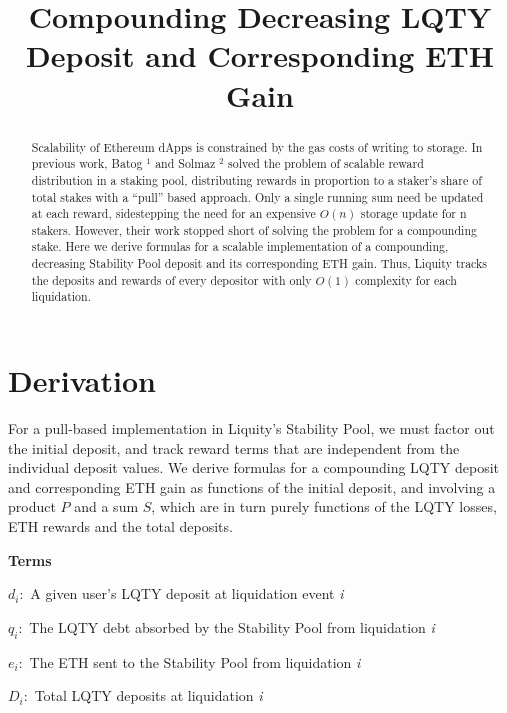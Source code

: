 \documentclass[reqno]{article}
\begin{document}
\title{\textbf{Compounding Decreasing LQTY Deposit and Corresponding ETH Gain}}
\date{} %
\maketitle
\begin{abstract}
    Scalability of Ethereum dApps is constrained by the gas costs of writing to storage. 
    In previous work, Batog $^{1}$ and Solmaz $^{2}$ solved the problem of scalable reward distribution in a staking pool, distributing rewards in proportion to a staker’s share of total stakes with a “pull” based approach. Only a single running sum need be updated at each reward, sidestepping the need for an expensive $O(n)$ storage update for n stakers. However, their work stopped short of solving the problem for a compounding stake.
    Here we derive formulas for a scalable implementation of a compounding, decreasing Stability Pool deposit and its corresponding ETH gain. Thus, Liquity tracks the deposits and rewards of every depositor with only $O(1)$ complexity for each liquidation.
\end{abstract}

\section{Derivation}
For a pull-based implementation in Liquity’s Stability Pool, we must factor out the initial deposit, and track reward terms that are independent from the individual deposit values. We derive formulas for a compounding LQTY deposit and corresponding ETH gain as functions of the initial deposit, and involving a product $P$ and a sum $S$, which are in turn purely functions of the LQTY losses, ETH rewards and the total deposits.

\bigskip
\raggedright %

\textbf{Terms}
\begin{terms}
    \item $d_i:$ A given user’s LQTY deposit at liquidation event \textit{i}\\
    \item $q_i:$ The LQTY debt absorbed by the Stability Pool from liquidation \textit{i}\\
    \item $e_i:$ The ETH sent to the Stability Pool from liquidation \textit{i}\\
    \item $D_i:$ Total LQTY deposits at liquidation \textit{i}
\end{terms}
\end{document}
